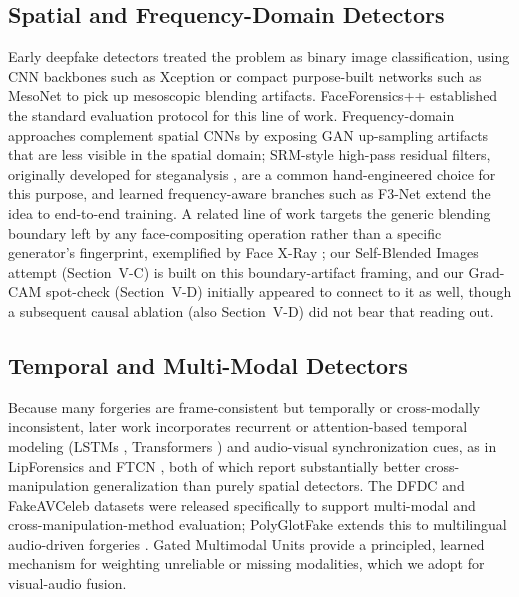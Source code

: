 \documentclass[conference]{IEEEtran}
\begin{document}
\subsection{Spatial and Frequency-Domain Detectors}
Early deepfake detectors treated the problem as binary image classification,
using CNN backbones such as Xception \cite{chollet2017xception} or compact
purpose-built networks such as MesoNet \cite{afchar2018mesonet} to pick up
mesoscopic blending artifacts. FaceForensics++ \cite{rossler2019faceforensics}
established the standard evaluation protocol for this line of work.
Frequency-domain approaches complement spatial CNNs by exposing GAN
up-sampling artifacts that are less visible in the spatial domain; SRM-style
high-pass residual filters, originally developed for steganalysis
\cite{fridrich2012srm}, are a common hand-engineered choice for this
purpose, and learned frequency-aware branches such as F3-Net
\cite{qian2020f3net} extend the idea to end-to-end training. A related line
of work targets the generic blending boundary left by any face-compositing
operation rather than a specific generator's fingerprint, exemplified by
Face X-Ray \cite{li2020facexray}; our Self-Blended Images attempt
(Section~V-C) is built on this boundary-artifact framing, and our
Grad-CAM spot-check (Section~V-D) initially appeared to connect to it as
well, though a subsequent causal ablation (also Section~V-D) did not bear
that reading out.

\subsection{Temporal and Multi-Modal Detectors}
Because many forgeries are frame-consistent but temporally or
cross-modally inconsistent, later work incorporates recurrent or attention-based
temporal modeling (LSTMs \cite{hochreiter1997lstm,schuster1997bidirectional},
Transformers \cite{vaswani2017attention}) and audio-visual synchronization
cues, as in LipForensics \cite{haliassos2021lipforensics} and FTCN
\cite{zheng2021ftcn}, both of which report substantially better
cross-manipulation generalization than purely spatial detectors. The DFDC
\cite{dolhansky2020dfdc} and FakeAVCeleb
\cite{khalid2021fakeavceleb} datasets were released specifically to support
multi-modal and cross-manipulation-method evaluation; PolyGlotFake extends
this to multilingual audio-driven forgeries \cite{polyglotfake2025}.
Gated Multimodal Units \cite{arevalo2017gmu} provide a principled,
learned mechanism for weighting unreliable or missing modalities, which we
adopt for visual-audio fusion.
\end{document}
